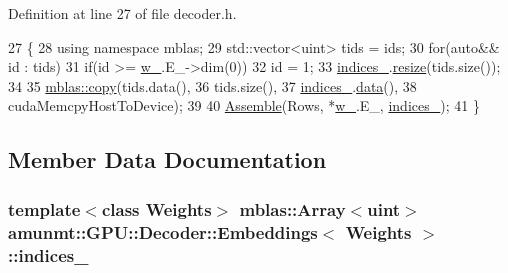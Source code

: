 Definition at line 27 of file decoder.\+h.


\begin{DoxyCode}
27                                                                    \{
28           \textcolor{keyword}{using namespace }mblas;
29           std::vector<uint> tids = ids;
30           \textcolor{keywordflow}{for}(\textcolor{keyword}{auto}&& \textcolor{keywordtype}{id} : tids)
31             \textcolor{keywordflow}{if}(\textcolor{keywordtype}{id} >= \hyperlink{classamunmt_1_1GPU_1_1Decoder_1_1Embeddings_aa19afc31e320bd10be7ea1d9a0a9acc2}{w\_}.E\_->dim(0))
32               \textcolor{keywordtype}{id} = 1;
33           \hyperlink{classamunmt_1_1GPU_1_1Decoder_1_1Embeddings_a37dc8ee1950cc98d0c4d9b130729096c}{indices\_}.\hyperlink{classamunmt_1_1GPU_1_1mblas_1_1Array_ac5a8bd146e017b8bacd499053ca159cb}{resize}(tids.size());
34 
35           \hyperlink{namespaceamunmt_1_1GPU_1_1mblas_a6531a040aa422fcd149f89b92f6d2585}{mblas::copy}(tids.data(),
36               tids.size(),
37               \hyperlink{classamunmt_1_1GPU_1_1Decoder_1_1Embeddings_a37dc8ee1950cc98d0c4d9b130729096c}{indices\_}.\hyperlink{classamunmt_1_1GPU_1_1mblas_1_1Array_a4034555b63c429f5f3113e7297094861}{data}(),
38               cudaMemcpyHostToDevice);
39 
40           \hyperlink{namespaceamunmt_1_1GPU_1_1mblas_a45e67b812840551fae28c4f7cca2b562}{Assemble}(Rows, *\hyperlink{classamunmt_1_1GPU_1_1Decoder_1_1Embeddings_aa19afc31e320bd10be7ea1d9a0a9acc2}{w\_}.E\_, \hyperlink{classamunmt_1_1GPU_1_1Decoder_1_1Embeddings_a37dc8ee1950cc98d0c4d9b130729096c}{indices\_});
41         \}
\end{DoxyCode}


\subsection{Member Data Documentation}
\subsubsection[{\texorpdfstring{indices\+\_\+}{indices_}}]{\setlength{\rightskip}{0pt plus 5cm}template$<$class Weights$>$ {\bf mblas\+::\+Array}$<$uint$>$ {\bf amunmt\+::\+G\+P\+U\+::\+Decoder\+::\+Embeddings}$<$ {\bf Weights} $>$\+::indices\+\_\+\hspace{0.3cm}{\ttfamily [private]}}\hypertarget{classamunmt_1_1GPU_1_1Decoder_1_1Embeddings_a37dc8ee1950cc98d0c4d9b130729096c}{}\label{classamunmt_1_1GPU_1_1Decoder_1_1Embeddings_a37dc8ee1950cc98d0c4d9b130729096c}


